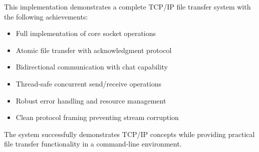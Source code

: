 \documentclass[12pt, letterpaper]{article}
\begin{document}
This implementation demonstrates a complete TCP/IP file transfer system with the following achievements:

\begin{itemize}
    \item Full implementation of core socket operations
    \item Atomic file transfer with acknowledgment protocol
    \item Bidirectional communication with chat capability
    \item Thread-safe concurrent send/receive operations
    \item Robust error handling and resource management
    \item Clean protocol framing preventing stream corruption
\end{itemize}

The system successfully demonstrates TCP/IP concepts while providing practical file transfer functionality in a command-line environment.
\end{document}

